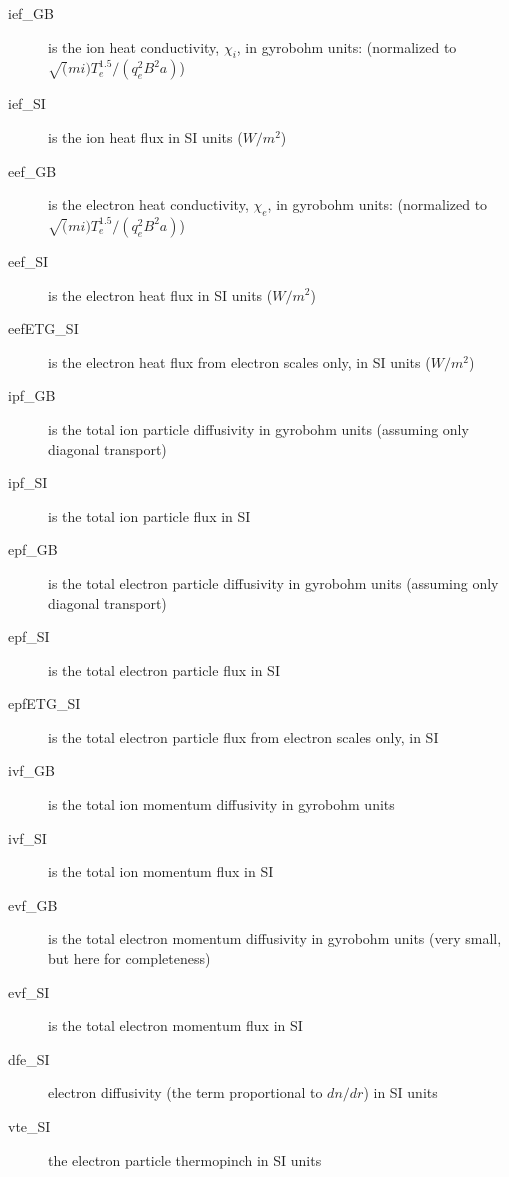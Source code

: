 \documentclass{article}
\begin{document}
\begin{description} 
\item[ief\_GB] is the ion heat conductivity, $\chi_i$, in gyrobohm units: (normalized to $\sqrt(mi)T_e^{1.5}/(q_e^2B^2a)$)

\item[ief\_SI] is the ion heat flux in SI units ($W/m^2$)

\item[eef\_GB] is the electron heat conductivity, $\chi_e$, in gyrobohm units: (normalized to $\sqrt(mi)T_e^{1.5}/(q_e^2B^2a)$)

\item[eef\_SI] is the electron heat flux in SI units ($W/m^2$)

\item[eefETG\_SI] is the electron heat flux from electron scales only, in SI units ($W/m^2$)

\item[ipf\_GB] is the total ion particle diffusivity in gyrobohm units (assuming only diagonal transport)

\item[ipf\_SI] is the total ion particle flux in SI 

\item[epf\_GB] is the total electron particle diffusivity in gyrobohm units (assuming only diagonal transport)

\item[epf\_SI] is the total electron particle flux in SI 

\item[epfETG\_SI] is the total electron particle flux from electron scales only, in SI 

\item[ivf\_GB] is the total ion momentum diffusivity in gyrobohm units 

\item[ivf\_SI] is the total ion momentum flux in SI 

\item[evf\_GB] is the total electron momentum diffusivity in gyrobohm units (very small, but here for completeness)

\item[evf\_SI] is the total electron momentum flux in SI 

\item[dfe\_SI] electron diffusivity (the term proportional to $dn/dr$) in SI units

\item[vte\_SI] the electron particle thermopinch in SI units


\end{description}
\end{document}
